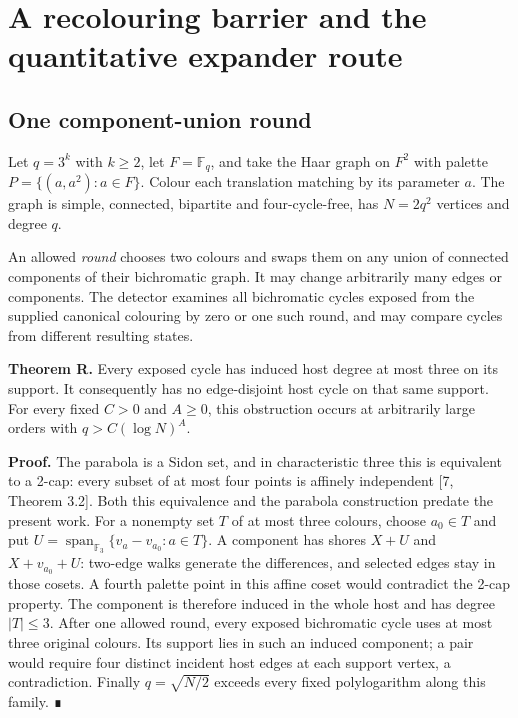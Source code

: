 \documentclass[smallextended]{svjour3}
\newcounter{none} %
\begin{document}
\section{A recolouring barrier and the quantitative expander
route}\label{a-recolouring-barrier-and-the-quantitative-expander-route}

\subsection{One component-union
round}\label{one-component-union-round}

Let \(q=3^k\) with \(k\geq2\), let \(F=\mathbb F_q\), and take the Haar
graph on \(F^2\) with palette \(P=\{(a,a^2):a\in F\}\). Colour each
translation matching by its parameter \(a\). The graph is simple,
connected, bipartite and four-cycle-free, has \(N=2q^2\) vertices and
degree \(q\).

An allowed \emph{round} chooses two colours and swaps them on any union
of connected components of their bichromatic graph. It may change
arbitrarily many edges or components. The detector examines all
bichromatic cycles exposed from the supplied canonical colouring by zero
or one such round, and may compare cycles from different resulting
states.

\textbf{Theorem R.} Every exposed cycle has induced host degree at most
three on its support. It consequently has no edge-disjoint host cycle on
that same support. For every fixed \(C>0\) and \(A\geq0\), this
obstruction occurs at arbitrarily large orders with \(q>C(\log N)^A\).

\textbf{Proof.} The parabola is a Sidon set, and in characteristic three
this is equivalent to a 2-cap: every subset of at most four points is
affinely independent {[}7, Theorem 3.2{]}. Both this equivalence and the
parabola construction predate the present work. For a nonempty set \(T\)
of at most three colours, choose \(a_0\in T\) and put
\(U=\operatorname{span}_{\mathbb F_3}\{v_a-v_{a_0}:a\in T\}\). A
component has shores \(X+U\) and \(X+v_{a_0}+U\): two-edge walks
generate the differences, and selected edges stay in those cosets. A
fourth palette point in this affine coset would contradict the 2-cap
property. The component is therefore induced in the whole host and has
degree \(|T|\leq3\). After one allowed round, every exposed bichromatic
cycle uses at most three original colours. Its support lies in such an
induced component; a pair would require four distinct incident host
edges at each support vertex, a contradiction. Finally \(q=\sqrt{N/2}\)
exceeds every fixed polylogarithm along this family. ∎
\end{document}
